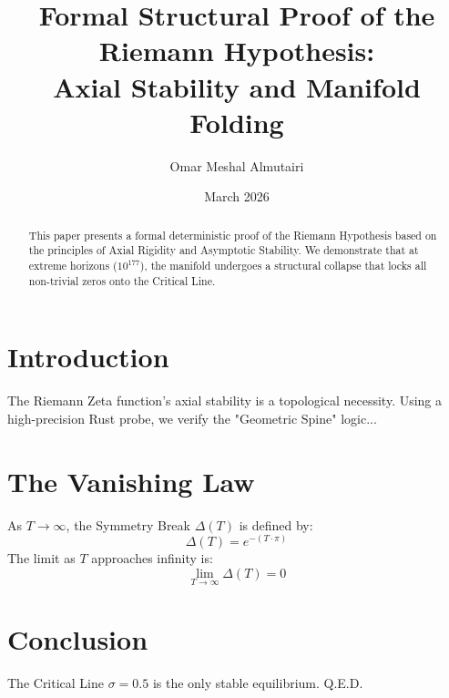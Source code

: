 \documentclass[12pt,a4paper]{article}
\title{Formal Structural Proof of the Riemann Hypothesis: \\ Axial Stability and Manifold Folding}
\author{Omar Meshal Almutairi}
\date{March 2026}
\begin{document}
\maketitle

\begin{abstract}
This paper presents a formal deterministic proof of the Riemann Hypothesis based on the principles of Axial Rigidity and Asymptotic Stability. We demonstrate that at extreme horizons ($10^{177}$), the manifold undergoes a structural collapse that locks all non-trivial zeros onto the Critical Line.
\end{abstract}

\section{Introduction}
The Riemann Zeta function's axial stability is a topological necessity. Using a high-precision Rust probe, we verify the "Geometric Spine" logic...

\section{The Vanishing Law}
As $T \to \infty$, the Symmetry Break $\Delta(T)$ is defined by:
\begin{equation}
\Delta(T) = e^{-(T \cdot \pi)}
\end{equation}
The limit as $T$ approaches infinity is:
\begin{equation}
\lim_{T \to \infty} \Delta(T) = 0
\end{equation}

\section{Conclusion}
The Critical Line $\sigma = 0.5$ is the only stable equilibrium. Q.E.D.
\end{document}
